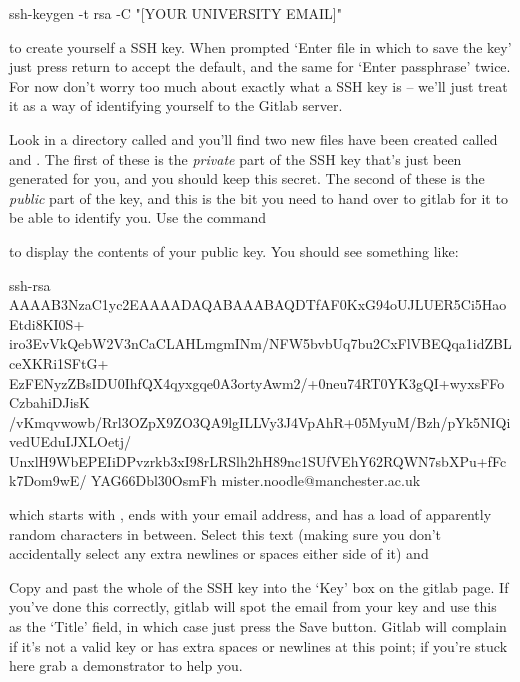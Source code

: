 \begin{ttoutenv}
ssh-keygen -t rsa -C "[YOUR UNIVERSITY EMAIL]"
\end{ttoutenv}

to create yourself a SSH key. When prompted `Enter file in which to save the key' just press return to accept the default, and the same for `Enter passphrase' twice.  For now don't worry too much about exactly what a SSH key is -- we'll just treat it as a way of identifying yourself to the Gitlab server. 

Look in a directory called  and you'll find two new files have been created called  and . The first of these is the \textit{private} part of the SSH key that's just been generated for you, and you should keep this secret. The second of these is the \textit{public} part of the key, and this is the bit you need to hand over to gitlab for it to be able to identify you. Use the command

to display the contents of your public key. You should see something like:

\begin{ttoutenv}
  
  ssh-rsa  AAAAB3NzaC1yc2EAAAADAQABAAABAQDTfAF0KxG94oUJLUER5Ci5HaoEtdi8KI0S+
  iro3EvVkQebW2V3nCaCLAHLmgmINm/NFW5bvbUq7bu2CxFlVBEQqa1idZBLceXKRi1SFtG+
  EzFENyzZBsIDU0IhfQX4qyxgqe0A3ortyAwm2/+0neu74RT0YK3gQI+wyxsFFoCzbahiDJisK
  /vKmqvwowb/Rrl3OZpX9ZO3QA9lgILLVy3J4VpAhR+05MyuM/Bzh/pYk5NIQivedUEduIJXLOetj/
  UnxlH9WbEPEIiDPvzrkb3xI98rLRSlh2hH89nc1SUfVEhY62RQWN7sbXPu+fFck7Dom9wE/
  YAG66Dbl30OsmFh mister.noodle@manchester.ac.uk

\end{ttoutenv}


which starts with , ends with your email address, and has a load of apparently random characters in between. Select this text (making sure you don't accidentally select any extra newlines or spaces either side of it) and 

Copy and past the whole of the SSH key into the `Key' box on the gitlab page. If you've done this correctly, gitlab will spot the email from your key and use this as the `Title' field, in which case just press the Save button. Gitlab will complain if it's not a valid key or has extra spaces or newlines at this point; if you're stuck here grab a demonstrator to help you. 

